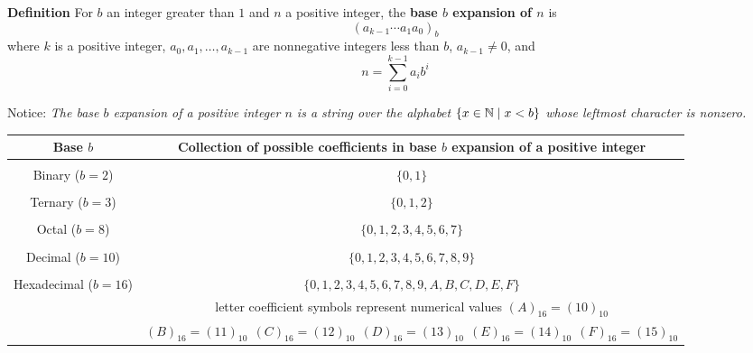 
{\bf Definition} For $b$ an integer greater than $1$ and $n$ a positive integer, 
the {\bf base $b$ expansion of $n$}  is
\[
(a_{k-1} \cdots a_1 a_0)_b
\]
where $k$ is a positive integer, $a_0, a_1, \ldots, a_{k-1}$ 
are nonnegative integers less than $b$, $a_{k-1} \neq  0$, and
\[
n =  \sum_{i=0}^{k-1} a_{i} b^{i}
\]

Notice: {\it The base $b$ expansion of a positive integer $n$ is a string over the alphabet 
$\{x \in \mathbb{N} \mid x < b\}$
whose leftmost character is nonzero.}

\begin{center}
\begin{tabular}{|c|c|}
\hline
Base $b$ & Collection of possible coefficients in base $b$ expansion of  a positive integer \\
\hline
& \\
Binary ($b=2$) & $\{0,1\}$ \\
\hline
& \\
Ternary ($b=3$) & $\{0,1, 2\}$ \\
\hline
& \\
Octal ($b=8$) & $\{0,1, 2, 3, 4, 5, 6, 7\}$\\
\hline
& \\
Decimal ($b=10$) & $\{0,1, 2, 3, 4, 5, 6, 7, 8, 9\}$\\
\hline
& \\
Hexadecimal ($b=16$) &  $\{0,1, 2, 3, 4, 5, 6, 7, 8, 9, A, B, C, D, E, F\}$\\
& letter coefficient symbols represent numerical values $(A)_{16} = (10)_{10}$\\
&$(B)_{16} = (11)_{10} ~~(C)_{16} = (12)_{10} ~~
 (D)_{16} = (13)_{10} ~~ (E)_{16} = (14)_{10} ~~ (F)_{16} = (15)_{10} $\\
\hline
\end{tabular}
\end{center}

